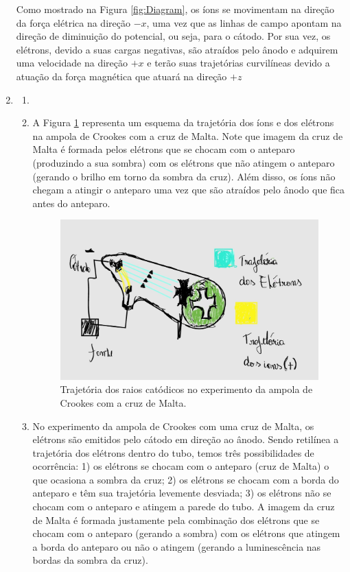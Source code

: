 \documentclass[12pt,a4paper]{article}
\begin{document}
\begin{enumerate}
    Como mostrado na Figura \ref{fig:Diagram}, os íons se movimentam na direção da força elétrica na direção $-x$, uma vez que as linhas de campo apontam na direção de diminuição do potencial, ou seja, para o cátodo. Por sua vez, os elétrons, devido a suas cargas negativas, são atraídos pelo ânodo e adquirem uma velocidade na direção $+x$ e terão suas trajetórias curvilíneas devido a atuação da força magnética que atuará na direção $+z$
    


    \item 
    \begin{enumerate}
        \item 



        \item A Figura \ref{fig:1_b_} representa um esquema da trajetória dos íons e dos elétrons na ampola de Crookes com a cruz de Malta. Note que imagem da cruz de Malta é formada pelos elétrons que se chocam com o anteparo (produzindo a sua sombra) com os elétrons que não atingem o anteparo (gerando o brilho em torno da sombra da cruz). Além disso, os íons não chegam a atingir o anteparo uma vez que são atraídos pelo ânodo que fica antes do anteparo.
        \begin{figure}[htp!]
            \centering
            \includegraphics[width=0.7\linewidth]{Figures/Fig1_b).jpg}
            \caption{Trajetória dos raios catódicos no experimento da ampola de Crookes com a cruz de Malta.}
            \label{fig:1_b_}
        \end{figure}



        \item No experimento da ampola de Crookes com uma cruz de Malta, os elétrons são emitidos pelo cátodo em direção ao ânodo. Sendo retilínea a trajetória dos elétrons dentro do tubo, temos três possibilidades de ocorrência: 1) os elétrons se chocam com o anteparo (cruz de Malta) o que ocasiona a sombra da cruz; 2) os elétrons se chocam com a borda do anteparo e têm sua trajetória levemente desviada; 3) os elétrons não se chocam com o anteparo e atingem a parede do tubo. A imagem da cruz de Malta é formada justamente pela combinação dos elétrons que se chocam com o anteparo (gerando a sombra) com os elétrons que atingem a borda do anteparo ou não o atingem (gerando a luminescência nas bordas da sombra da cruz).
    \end{enumerate}




\end{enumerate}
\end{document}
